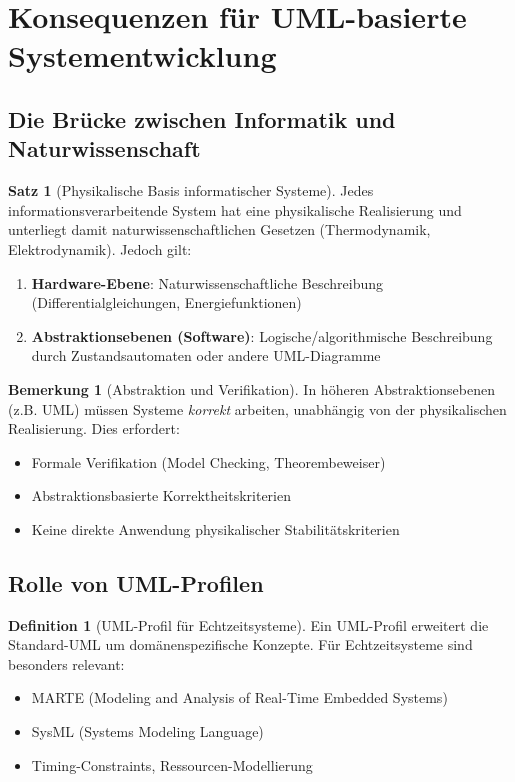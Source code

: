 ﻿\documentclass[a4paper,12pt]{report}
\theoremstyle{definition}
\newtheorem{definition}{Definition}[section]
\newtheorem{bemerkung}{Bemerkung}[section]
\newtheorem{satz}{Satz}[section]
\begin{document}
\section{Konsequenzen für UML-basierte Systementwicklung}

\subsection{Die Brücke zwischen Informatik und Naturwissenschaft}

\begin{satz}[Physikalische Basis informatischer Systeme]
	Jedes informationsverarbeitende System hat eine physikalische Realisierung und unterliegt damit naturwissenschaftlichen Gesetzen (Thermodynamik, Elektrodynamik). Jedoch gilt:
	\begin{enumerate}
		\item[-] \textbf{Hardware-Ebene}: Naturwissenschaftliche Beschreibung (Differentialgleichungen, Energiefunktionen)
		\item[-] \textbf{Abstraktionsebenen (Software)}: Logische/algorithmische Beschreibung durch Zu\-stands\-automaten oder andere UML-Diagramme
	\end{enumerate}
\end{satz}

\begin{bemerkung}[Abstraktion und Verifikation]
	In höheren Abstraktionsebenen (z.B. UML) müssen Systeme \textit{korrekt} arbeiten, unabhängig von der physikalischen Realisierung. Dies erfordert:
	\begin{itemize}
		\item[-] Formale Verifikation (Model Checking, Theorembeweiser)
		\item[-] Abstraktionsbasierte Korrektheitskriterien
		\item[-] Keine direkte Anwendung physikalischer Stabilitätskriterien
	\end{itemize}
\end{bemerkung}

\subsection{Rolle von UML-Profilen}

\begin{definition}[UML-Profil für Echtzeitsysteme]
	Ein UML-Profil erweitert die Standard-UML um domänenspezifische Konzepte. Für Echtzeitsysteme sind besonders relevant:
	\begin{itemize}
		\item[-] MARTE (Modeling and Analysis of Real-Time Embedded Systems)
		\item[-] SysML (Systems Modeling Language)
		\item[-] Timing-Constraints, Ressourcen-Modellierung
	\end{itemize}
\end{definition}
\end{document}
